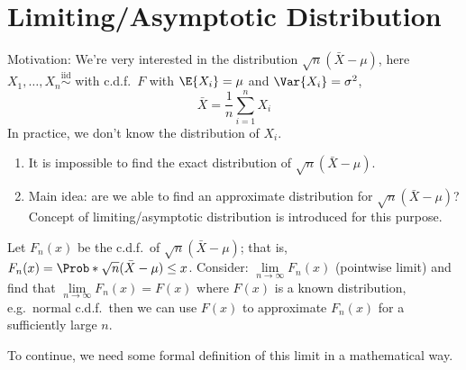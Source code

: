 \chapter{Limiting/Asymptotic Distribution}
Motivation: We're very interested in the distribution
$ \sqrt{n}(\bar{X}-\mu) $, here $ X_1,\ldots,X_n
    \stackrel{\text{iid}}{\sim} $ with c.d.f.\ $ F $ with
$ \E{X_i}=\mu $ and $ \Var{X_i}=\sigma^2 $,
\[ \bar{X}=\frac{1}{n} \sum_{i=1}^{n} X_i \]
In practice, we don't know the distribution of $ X_i $.
\begin{Remark}{}{}
    \begin{enumerate}[label=(\roman*)]
        \item It is impossible to find the exact distribution of
              $ \sqrt{n}(\bar{X}-\mu) $.
        \item Main idea: are we able to find an approximate
              distribution for $ \sqrt{n}(\bar{X}-\mu) $?
              Concept of limiting/asymptotic distribution
              is introduced for this purpose.
    \end{enumerate}
\end{Remark}
Let $ F_n(x) $ be the c.d.f.\ of $ \sqrt{n}(\bar{X}-\mu) $;
that is, $ F_n(x)=\Prob*{\sqrt{n}(\bar{X}-\mu)\le x} $.
Consider: $ \lim\limits_{{n} \to {\infty}} F_n(x) $ (pointwise
limit) and find that $ \lim\limits_{{n} \to {\infty}} F_n(x)=F(x) $
where $ F(x) $ is a known distribution, e.g.\ normal c.d.f.\
then we can use $ F(x) $ to approximate $ F_n(x) $ for a sufficiently
large $ n $.

To continue, we need some formal definition of this limit
in a mathematical way.

